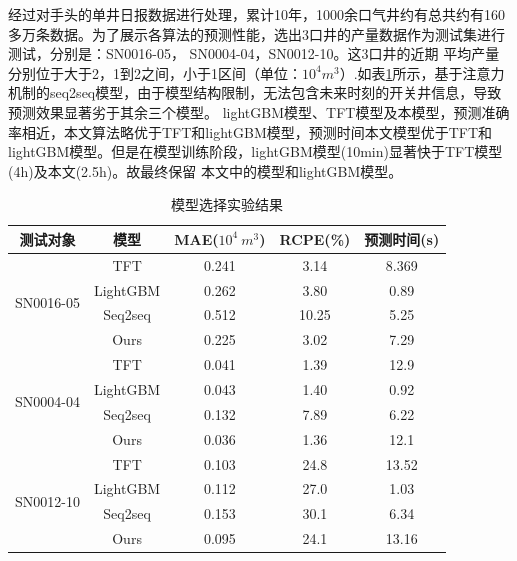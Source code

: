 经过对手头的单井日报数据进行处理，累计10年，1000余口气井约有总共约有160多万条数据。为了展示各算法的预测性能，选出3口井的产量数据作为测试集进行测试，分别是：SN0016-05， SN0004-04，SN0012-10。这3口井的近期
平均产量分别位于大于2，1到2之间，小于1区间（单位：$10^4m^3$）.如表\ref{fig:modelselection}所示，基于注意力机制的seq2seq模型，由于模型结构限制，无法包含未来时刻的开关井信息，导致预测效果显著劣于其余三个模型。
lightGBM模型、TFT模型及本模型，预测准确率相近，本文算法略优于TFT和lightGBM模型，预测时间本文模型优于TFT和lightGBM模型。但是在模型训练阶段，lightGBM模型(10min)显著快于TFT模型(4h)及本文(2.5h)。故最终保留
本文中的模型和lightGBM模型。
\begin{table}[H]
    \renewcommand{\arraystretch}{1.5}
    \caption{模型选择实验结果}
    \label{fig:modelselection}
    \centering
    \begin{tabular}{|c|c|c|c|c|}
        \hline
        \textbf{测试对象} & \textbf{模型} & \textbf{MAE($10^4 \ m^3$)} & \textbf{RCPE(\%)} & \textbf{预测时间(s)} \\ \hline
        \multirow{4}{*}{SN0016-05}  & TFT          & 0.241                       & 3.14              & 8.369                \\ \cline{2-5}
                                    & LightGBM     & 0.262                       & 3.80              & 0.89                 \\ \cline{2-5}
                                    & Seq2seq      & 0.512                       & 10.25             & 5.25                 \\ \cline{2-5}
                                    & Ours         & 0.225                       & 3.02              & 7.29                 \\ \hline
        \multirow{4}{*}{SN0004-04}  & TFT          & 0.041                       & 1.39              & 12.9                 \\ \cline{2-5}
                                    & LightGBM     & 0.043                       & 1.40              & 0.92                 \\ \cline{2-5}
                                    & Seq2seq      & 0.132                       & 7.89              & 6.22                 \\ \cline{2-5}
                                    & Ours         & 0.036                       & 1.36              & 12.1                 \\ \hline
        \multirow{4}{*}{SN0012-10}  & TFT          & 0.103                       & 24.8              & 13.52                \\ \cline{2-5}
                                    & LightGBM     & 0.112                       & 27.0              & 1.03                 \\ \cline{2-5}
                                    & Seq2seq      & 0.153                       & 30.1              & 6.34                 \\ \cline{2-5}
                                    & Ours         & 0.095                       & 24.1              & 13.16                \\ \hline
    \end{tabular}
\end{table}
